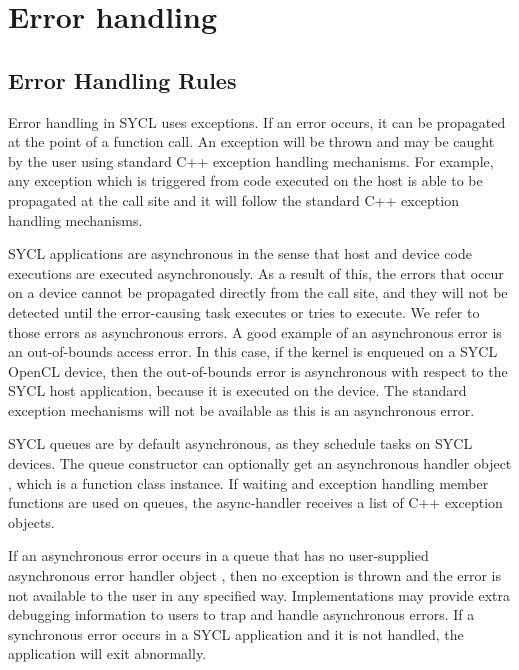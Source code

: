 \section{Error handling}
\label{error-handling}

\subsection{Error Handling Rules}

Error handling in SYCL uses exceptions. If an error occurs, it can
be propagated at the point of a function call. An exception will
be thrown and may be caught by the user using standard C++ exception handling
mechanisms. For example, any exception which is triggered from code executed on the
host is able to be propagated at the call site and it will follow the standard
C++ exception handling mechanisms.

SYCL applications are asynchronous in the sense that host and device code executions
are executed asynchronously. As a result of this, the errors that occur on a
device cannot be propagated directly from the call site, and they will not be
detected until the error-causing task executes or tries to execute.
We refer to those errors as asynchronous errors.
A good example of an asynchronous error is an out-of-bounds access error.
In this case, if the kernel is enqueued on a SYCL OpenCL device, then the
out-of-bounds error is asynchronous with respect to the SYCL host application,
because it is executed on the device. The standard exception mechanisms
will not be available as this is an asynchronous error.

SYCL queues are by default asynchronous, as they schedule tasks on SYCL devices.
The queue constructor can optionally get an asynchronous handler object
, which is a function class instance. If waiting and
exception handling member functions are used on queues, the \gls{async-handler} receives
a list of C++ exception objects.

If an asynchronous error occurs in a queue that has no user-supplied
asynchronous error handler object , then no exception
is thrown and the error is not available to the user in any specified way.
Implementations may provide extra debugging information to users to trap and handle
asynchronous errors. If a synchronous error occurs in a SYCL application and it
is not handled, the application will exit abnormally.


